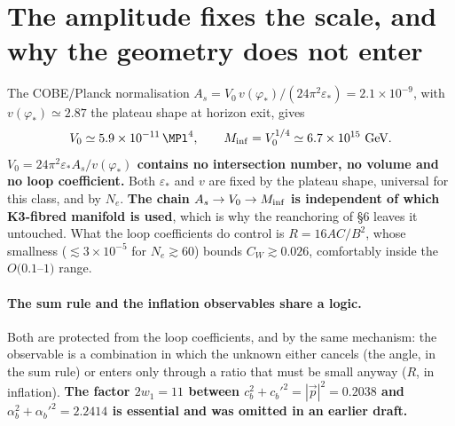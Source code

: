 \section{The amplitude fixes the scale, and why the geometry does not enter}
The COBE/Planck normalisation $A_s=V_0\,v(\varphi_*)/(24\pi^2\varepsilon_*)=2.1\times10^{-9}$, with $v(\varphi_*)\simeq2.87$ the plateau shape at horizon exit, gives
\begin{equation}
V_0\simeq5.9\times10^{-11}\,\MPl^4,\qquad M_{\rm inf}=V_0^{1/4}\simeq6.7\times10^{15}~\text{GeV}.
\end{equation}
\textbf{$V_0=24\pi^2\varepsilon_*A_s/v(\varphi_*)$ contains no intersection number, no volume and no loop coefficient.} Both $\varepsilon_*$ and $v$ are fixed by the plateau shape, universal for this class, and by $N_e$. \textbf{The chain $A_s\to V_0\to M_{\rm inf}$ is independent of which K3-fibred manifold is used}, which is why the reanchoring of \S6 leaves it untouched. What the loop coefficients do control is $R=16AC/B^2$, whose smallness ($\lesssim3\times10^{-5}$ for $N_e\gtrsim60$) bounds $C_W\gtrsim0.026$, comfortably inside the $O(0.1$--$1)$ range.

\paragraph{The sum rule and the inflation observables share a logic.} Both are protected from the loop coefficients, and by the same mechanism: the observable is a combination in which the unknown either cancels (the angle, in the sum rule) or enters only through a ratio that must be small anyway ($R$, in inflation). \textbf{The factor $2w_1=11$ between $c_b^2+c_b'^2=|\vec p|^2=0.2038$ and $\alpha_b^2+\alpha_b'^2=2.2414$ is essential and was omitted in an earlier draft.}

